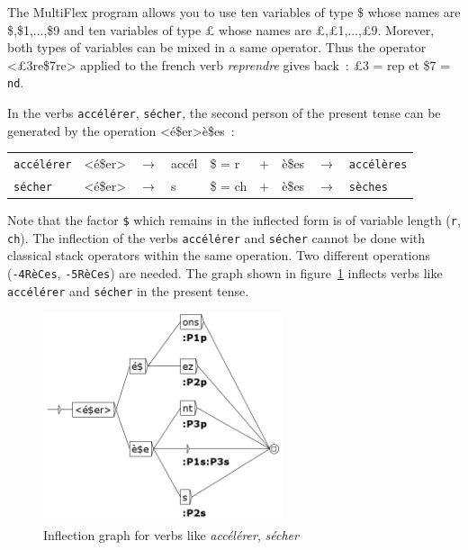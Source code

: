 \bigskip
\noindent
The MultiFlex program allows you to use ten variables of type \$ whose names are \$,\$1,...,\$9
and ten variables of type {\pounds} whose names are {\pounds},{\pounds}1,...,{\pounds}9.
Morever, both types of variables can be mixed in a same operator. Thus the operator <{\pounds}3re\$7re>
applied to the french verb {\it reprendre} gives back~: {\pounds}3 = rep et \$7 = \verb+nd+.

\bigskip
\noindent
In the verbs \verb+accélérer+, \verb+sécher+, the second person of the present tense
can be generated by the operation <é\$er>è\$es~:

\begin{center}
\begin{tabular}{lllllllll}
	\verb+accélérer+ & <é\$er> & $\rightarrow$ & accél & \$ = r & + & è\$es &  $\rightarrow$ & \verb+accélères+\\
	\verb+sécher+ & <é\$er> & $\rightarrow$ & s & \$ = ch & + & è\$es & $\rightarrow$ & \verb+sèches+\\
\end{tabular}
\end{center}

\noindent
Note that the factor \verb+$+ which remains in the inflected form is of variable length (\verb+r+, \verb+ch+). 
The inflection of the verbs \verb+accélérer+ and \verb+sécher+ cannot be done with classical stack operators
within the same operation. Two different operations (\verb+-4RèCes+, \verb+-5RèCes+) are
needed. The graph shown in figure~\ref{fig-inflection-secher} inflects verbs like
\verb+accélérer+ and \verb+sécher+ in the present tense.

\begin{figure}[!ht]
\begin{center}
\includegraphics[width=7cm]{resources/img/fig3-Advanced_operators_with_Variables-V_secher.png}
\caption{Inflection graph for verbs like {\it accélérer}, {\it sécher}
\label{fig-inflection-secher}}
\end{center}
\end{figure}

